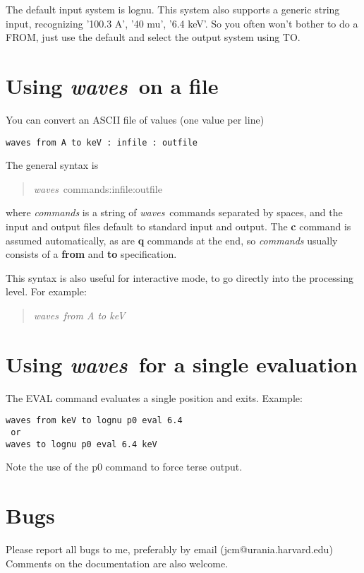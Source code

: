 \documentclass[12pt]{article}
\newcommand{\pr}{{\it waves}~}
\begin{document}
The default input system is lognu. This system also supports
a generic string input, recognizing '100.3 A', '40 mu', '6.4 keV'.
So you often won't bother to do a FROM, just use the
default and select the output system using TO.

\section{Using \pr on a file}

You can convert an ASCII file of values (one value per line)

\begin{verbatim}
waves from A to keV : infile : outfile
\end{verbatim}

The general syntax is 
\begin{quote} \pr  commands:infile:outfile \end{quote}
where {\it commands} is a string of \pr commands separated
by spaces, and the input and output files default to 
standard input and output. The {\bf c} command is assumed automatically,
as are {\bf q} commands at the end, so {\it commands} usually
consists of a {\bf from} and {\bf to} specification. 

This syntax is also useful for interactive mode, to go directly into
the processing level. For example:
\begin{quote} \pr {\it from A to keV }\end{quote}


\section{Using \pr for a single evaluation}

The EVAL command evaluates a single position and exits.
Example:
\begin{verbatim}
waves from keV to lognu p0 eval 6.4
 or
waves to lognu p0 eval 6.4 keV
\end{verbatim}
Note the use of the p0 command to force terse output.

\section{Bugs}

Please report all bugs to me, preferably by email (jcm@urania.harvard.edu)
Comments on the documentation are also welcome.
\end{document}
